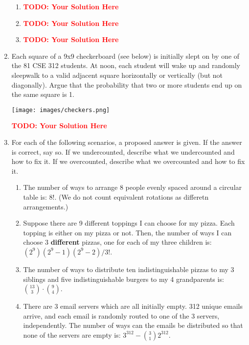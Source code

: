 \documentclass[12pt]{article}
\def\todo#1{\textcolor{red}{\textbf{#1}}}
\renewcommand{\|}{\mid}
\begin{document}
\begin{enumerate}
\begin{tcolorbox}
\begin{enumerate}
\item \todo{TODO: Your Solution Here}
\item \todo{TODO: Your Solution Here}
\item \todo{TODO: Your Solution Here}
\end{enumerate}
\end{tcolorbox}





\item Each square of a 9x9 checkerboard (see below) is initially slept on by one of the 81 CSE 312 students. At noon, each student will wake up and randomly sleepwalk to a valid adjacent square horizontally or vertically (but not diagonally). Argue that the probability that two or more students end up on the same square is 1.\\
\begin{center}
\texttt{[image: images/checkers.png]}
\end{center}

\begin{tcolorbox}
\todo{TODO: Your Solution Here}
\end{tcolorbox}


\item For each of the following scenarios, a proposed answer is given. If the answer is correct, say so. If we undercounted, describe what we undercounted and how to fix it. If we overcounted, describe what we overcounted and how to fix it.
\begin{enumerate}
    \item The number of ways to arrange 8 people evenly spaced around a circular table is: $8!$. (We do not count equivalent rotations as differetn arrangements.)
    \item Suppose there are 9 different toppings I can choose for my pizza. Each topping is either on my
pizza or not. Then, the number of ways I can choose 3 \textbf{different} pizzas, one for each of my three children
is: $(2^9)(2^9-1)(2^9-2)/3!$.
    \item The number of ways to distribute ten indistinguishable pizzas to my 3 siblings and five indistinguishable burgers to my 4 grandparents is: $\binom{13}{3}\cdot\binom{9}{4}$.
    \item There are 3 email servers which are all initially empty. 312 unique emails arrive, and each email is randomly routed to one of the 3 servers, independently. The number of ways can the emails be distributed so that none of the servers are empty is: $3^{312}-\binom{3}{1}2^{312}$.
\end{enumerate}


\end{enumerate}
\end{document}
